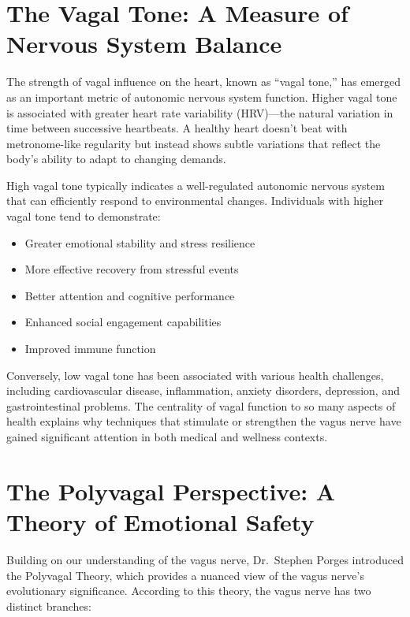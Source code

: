\documentclass[
  Letterpaper,
]{scrbook}
\providecommand{\tightlist}{%
  \setlength{\itemsep}{0pt}\setlength{\parskip}{0pt}}\usepackage{longtable,booktabs,array}
\begin{document}
\section{The Vagal Tone: A Measure of Nervous System
Balance}\label{the-vagal-tone-a-measure-of-nervous-system-balance}

The strength of vagal influence on the heart, known as ``vagal tone,''
has emerged as an important metric of autonomic nervous system function.
Higher vagal tone is associated with greater heart rate variability
(HRV)---the natural variation in time between successive heartbeats. A
healthy heart doesn't beat with metronome-like regularity but instead
shows subtle variations that reflect the body's ability to adapt to
changing demands.

High vagal tone typically indicates a well-regulated autonomic nervous
system that can efficiently respond to environmental changes.
Individuals with higher vagal tone tend to demonstrate:

\begin{itemize}
\tightlist
\item
  Greater emotional stability and stress resilience
\item
  More effective recovery from stressful events
\item
  Better attention and cognitive performance
\item
  Enhanced social engagement capabilities
\item
  Improved immune function
\end{itemize}

Conversely, low vagal tone has been associated with various health
challenges, including cardiovascular disease, inflammation, anxiety
disorders, depression, and gastrointestinal problems. The centrality of
vagal function to so many aspects of health explains why techniques that
stimulate or strengthen the vagus nerve have gained significant
attention in both medical and wellness contexts.

\section{The Polyvagal Perspective: A Theory of Emotional
Safety}\label{the-polyvagal-perspective-a-theory-of-emotional-safety}

Building on our understanding of the vagus nerve, Dr.~Stephen Porges
introduced the Polyvagal Theory, which provides a nuanced view of the
vagus nerve's evolutionary significance. According to this theory, the
vagus nerve has two distinct branches:
\end{document}
